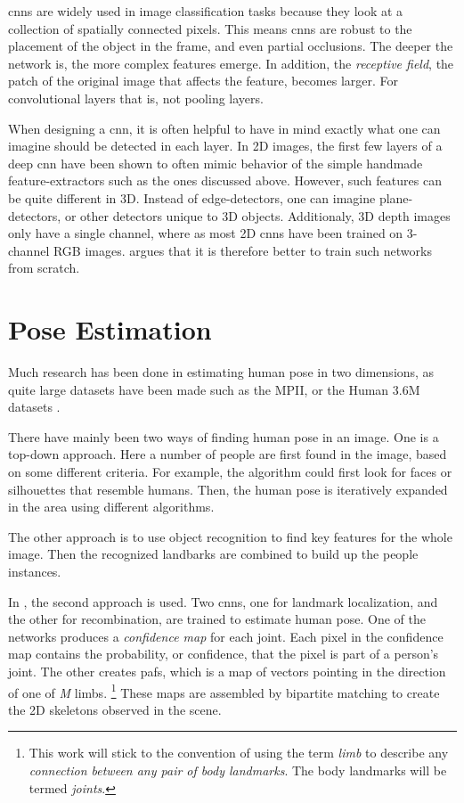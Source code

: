 \gls{cnn}s are widely used in image classification tasks because they look at a collection of spatially connected pixels. This means \gls{cnn}s are robust to the placement of the object in the frame, and even partial occlusions. The deeper the network is, the more complex features emerge. In addition, the \emph{receptive field}, the patch of the original image that affects the feature, becomes larger. For convolutional layers that is, not pooling layers.

When designing a \gls{cnn}, it is often helpful to have in mind exactly what one can imagine should be detected in each layer. In 2D images, the first few layers of a deep \gls{cnn} have been shown to often mimic behavior of the simple handmade feature-extractors such as the ones discussed above. However, such features can be quite different in 3D. Instead of edge-detectors, one can imagine plane-detectors, or other detectors unique to 3D objects. Additionaly, 3D depth images only have a single channel, where as most 2D \gls{cnn}s have been trained on 3-channel RGB images. \cite{song2018depth} argues that it is therefore better to train such networks from scratch.


\section{Pose Estimation}
Much research has been done in estimating human pose in two dimensions, as quite large datasets have been made such as the MPII, or the Human 3.6M datasets \cite{andriluka14cvpr,h36m_pami}.

There have mainly been two ways of finding human pose in an image. One is a top-down approach. Here a number of people are first found in the image, based on some different criteria. For example, the algorithm could first look for faces or silhouettes that resemble humans. Then, the human pose is iteratively expanded in the area using different algorithms.

The other approach is to use object recognition to find key features for the whole image. Then the recognized landbarks are combined to build up the people instances.

In \cite{cao2017realtime}, the second approach is used. Two \gls{cnn}s, one for landmark localization, and the other for recombination, are trained to estimate human pose. One of the networks produces a \emph{confidence map} for each joint. Each pixel in the confidence map contains the probability, or confidence, that the pixel is part of a person's joint. The other creates \gls{paf}s, which is a map of vectors pointing in the direction of one of \emph{M} limbs. \footnote{This work will stick to the convention of using the term \emph{limb} to describe any \emph{connection between any pair of body landmarks}. The body landmarks will be termed \emph{joints}.} These maps are assembled by bipartite matching to create the 2D skeletons observed in the scene.

